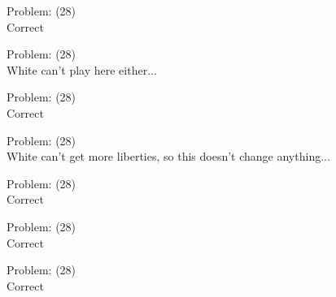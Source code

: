 \documentclass[11pt]{article}
\begin{document}
\begin{minipage}[t]{0.5\textwidth}
  {\centering
  
Problem: (28)\\
Correct\\
  }
\end{minipage}
\begin{minipage}[t]{0.5\textwidth}
  {\centering
  
Problem: (28)\\
White can't play here either...\\
  }
\end{minipage}
\begin{minipage}[t]{0.5\textwidth}
  {\centering
  
Problem: (28)\\
Correct\\
  }
\end{minipage}
\begin{minipage}[t]{0.5\textwidth}
  {\centering
  
Problem: (28)\\
White can't get more liberties, so this doesn't change anything...\\
  }
\end{minipage}
\begin{minipage}[t]{0.5\textwidth}
  {\centering
  
Problem: (28)\\
Correct\\
  }
\end{minipage}
\begin{minipage}[t]{0.5\textwidth}
  {\centering
  
Problem: (28)\\
Correct\\
  }
\end{minipage}
\begin{minipage}[t]{0.5\textwidth}
  {\centering
  
Problem: (28)\\
Correct\\
  }
\end{minipage}
\end{document}
